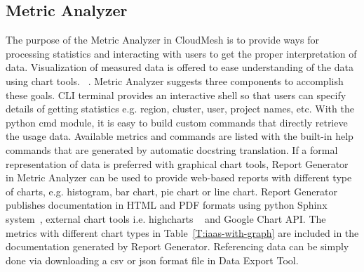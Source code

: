 \documentclass{tex/sig-alternate}
\begin{document}
{\subsection{Metric Analyzer}

The purpose of the Metric Analyzer in CloudMesh is to provide ways for processing statistics and interacting with users to get the proper interpretation of data. Visualization of measured data is offered to ease understanding of the data using chart tools. ~\cite{kosslyn1989understanding,pinker1990theory,friel2001making}. Metric Analyzer suggests three components to accomplish these goals. CLI terminal provides an interactive shell so that users can specify details of getting statistics e.g. region, cluster, user, project names, etc. With the python cmd module, it is easy to build custom commands that directly retrieve the usage data. Available metrics and commands are listed with the built-in help commands that are generated by automatic docstring translation. If a formal representation of data is preferred with graphical chart tools, Report Generator in Metric Analyzer can be used to provide web-based reports with different type of charts, e.g. histogram, bar chart, pie chart or line chart. Report Generator publishes documentation in HTML and PDF formats using python Sphinx system~\cite{brandl2009sphinx}, external chart tools i.e. highcharts ~\cite{highsoft2012highcharts} and Google Chart API. The metrics with different chart types in Table~\ref{T:iaas-with-graph} are included in the documentation generated by Report Generator. Referencing data can be simply done via downloading a csv or json format file in Data Export Tool.

}
\end{document}
